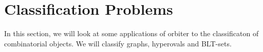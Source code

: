 \section{Classification Problems}
\label{sec:classification}



In this section, we will look at some applications of orbiter to the classificaton 
of combinatorial objects.
We will classify graphs, hyperovals and BLT-sets.


\bigskip




\bigskip




\bigskip





